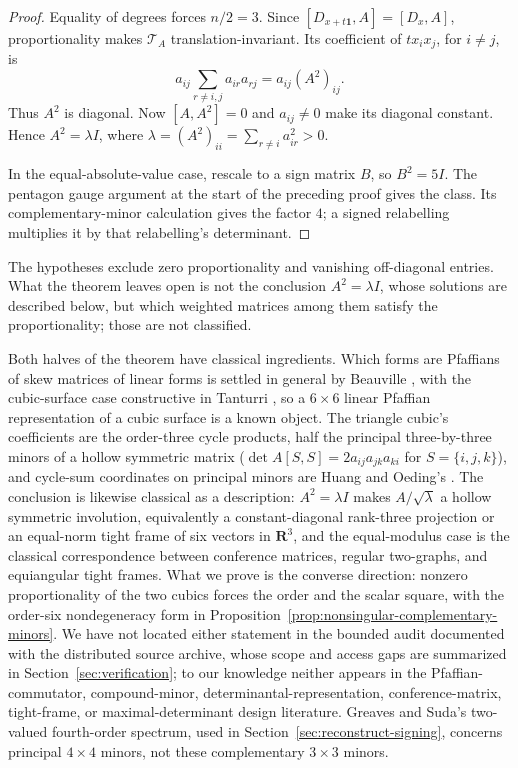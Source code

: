 \begin{proof}
Equality of degrees forces \(n/2=3\).  Since
\([D_{x+t\mathbf1},A]=[D_x,A]\), proportionality makes \(\mathcal T_A\)
translation-invariant.  Its coefficient of \(tx_ix_j\), for \(i\ne j\), is
\[
 a_{ij}\sum_{r\ne i,j}a_{ir}a_{rj}=a_{ij}(A^2)_{ij}.
\]
Thus \(A^2\) is diagonal.  Now \([A,A^2]=0\) and \(a_{ij}\ne0\) make its
diagonal constant.  Hence \(A^2=\lambda I\), where
\(\lambda=(A^2)_{ii}=\sum_{r\ne i}a_{ir}^2>0\).

In the equal-absolute-value case, rescale to a sign matrix \(B\), so
\(B^2=5I\).  The pentagon gauge argument at the start of the preceding proof
gives the class.  Its complementary-minor calculation gives the factor \(4\);
a signed relabelling multiplies it by that relabelling's determinant.
\end{proof}

The hypotheses exclude zero proportionality and vanishing off-diagonal entries.
What the theorem leaves open is not the conclusion \(A^2=\lambda I\), whose
solutions are described below, but which weighted matrices among them satisfy
the proportionality; those are not classified.

Both halves of the theorem have classical ingredients.  Which forms are
Pfaffians of skew matrices of linear forms is settled in general by Beauville
\cite{BeauvilleDeterminantal}, with the cubic-surface case constructive in
Tanturri \cite{TanturriPfaffian}, so a \(6\times6\) linear Pfaffian
representation of a cubic surface is a known object.  The triangle cubic's
coefficients are the order-three cycle products, half the principal
three-by-three minors of a hollow symmetric matrix
(\(\det A[S,S]=2a_{ij}a_{jk}a_{ki}\) for \(S=\{i,j,k\}\)), and cycle-sum
coordinates on principal minors are Huang and Oeding's \cite{HuangOeding}.
The conclusion is likewise classical as a description: \(A^2=\lambda I\)
makes \(A/\sqrt\lambda\) a hollow symmetric involution, equivalently a
constant-diagonal rank-three projection or an equal-norm tight frame of six
vectors in \(\mathbf R^3\), and the equal-modulus case is the classical
correspondence between conference matrices, regular two-graphs, and
equiangular tight frames.  What we prove is the converse direction: nonzero
proportionality of the two cubics forces the order and the scalar square,
with the order-six nondegeneracy form in
Proposition~\ref{prop:nonsingular-complementary-minors}.  We have not located
either statement in the bounded audit documented with the distributed source
archive, whose scope and access gaps are summarized in
Section~\ref{sec:verification}; to our knowledge neither appears in the
Pfaffian-commutator, compound-minor, determinantal-representation,
conference-matrix, tight-frame, or maximal-determinant design literature.
Greaves and Suda's two-valued fourth-order spectrum, used in
Section~\ref{sec:reconstruct-signing}, concerns principal \(4\times4\)
minors, not these complementary \(3\times3\) minors.

